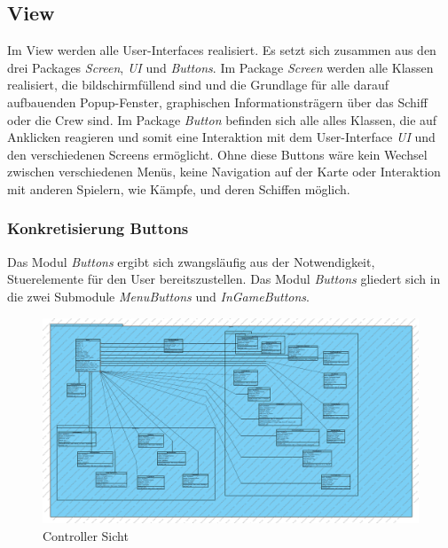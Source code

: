 \documentclass[fontsize=12pt,paper=a4,twoside]{scrartcl}
\begin{document}
\subsection{View}

Im View werden alle User-Interfaces realisiert. Es setzt sich zusammen aus den drei Packages \textit{Screen}, \textit{UI} und \textit{Buttons}. Im Package \textit{Screen} werden alle Klassen realisiert, die bildschirmfüllend sind und die Grundlage für alle darauf aufbauenden Popup-Fenster, graphischen Informationsträgern über das Schiff oder die Crew sind. Im Package \textit{Button} befinden sich alle alles Klassen, die auf Anklicken reagieren und somit eine Interaktion mit dem User-Interface \textit{UI} und den verschiedenen Screens ermöglicht. Ohne diese Buttons wäre kein Wechsel zwischen verschiedenen Menüs, keine Navigation auf der Karte oder Interaktion mit anderen Spielern, wie Kämpfe, und deren Schiffen möglich. 

\subsubsection{Konkretisierung Buttons}


Das Modul \textit{Buttons} ergibt sich zwangsläufig aus der Notwendigkeit, Stuerelemente für den User bereitszustellen. Das Modul \textit{Buttons} gliedert sich in die zwei Submodule \textit{MenuButtons} und \textit{InGameButtons}. 

\begin{figure}[H] 
\begin{center}
 \includegraphics[width=\textwidth]{../GT_Modulsicht/PDFs/View-Subdiagramm_Buttons.pdf}
  \caption{Controller Sicht}
  \label{fig:boat1}
\end{center}
\end{figure}
\end{document}
